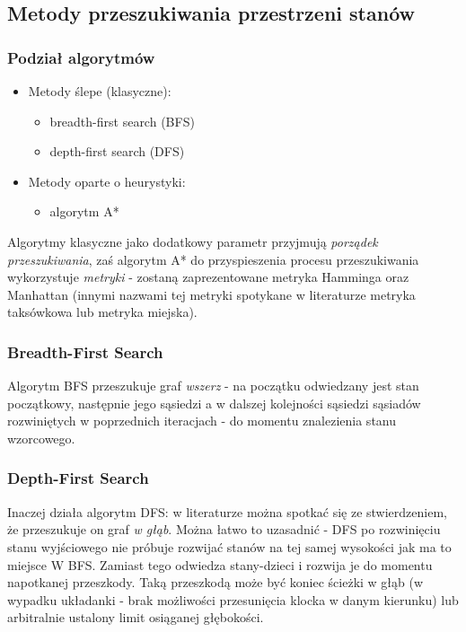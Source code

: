 \documentclass{classrep}
\begin{document}
\subsection{Metody przeszukiwania przestrzeni stanów}
\subsubsection{Podział algorytmów}
\begin{itemize}
  \item Metody ślepe (klasyczne):
    \begin{itemize}
      \item breadth-first search (BFS)
      \item depth-first search (DFS)
    \end{itemize}
  \item Metody oparte o heurystyki:
    \begin{itemize}
      \item algorytm A*
    \end{itemize}
\end{itemize}

Algorytmy klasyczne jako dodatkowy parametr przyjmują \emph{porządek
przeszukiwania}, zaś algorytm A* do przyspieszenia procesu
przeszukiwania wykorzystuje \emph{metryki} - zostaną zaprezentowane
metryka Hamminga oraz Manhattan (innymi nazwami tej metryki spotykane
w literaturze metryka taksówkowa lub metryka miejska).

\subsubsection{Breadth-First Search}

Algorytm BFS przeszukuje graf \emph{wszerz} - na początku
odwiedzany jest stan początkowy, następnie jego sąsiedzi
a w dalszej kolejności sąsiedzi sąsiadów rozwiniętych w poprzednich
iteracjach - do momentu znalezienia stanu wzorcowego.

\subsubsection{Depth-First Search}
Inaczej działa algorytm DFS: w literaturze można spotkać się ze
stwierdzeniem, że przeszukuje on graf \emph{w głąb}. Można łatwo to
uzasadnić - DFS po rozwinięciu stanu wyjściowego nie próbuje rozwijać stanów
na tej samej wysokości jak ma to miejsce W BFS. Zamiast tego odwiedza
stany-dzieci i rozwija je do momentu napotkanej przeszkody. Taką przeszkodą może
być koniec ścieżki w głąb (w wypadku układanki - brak możliwości przesunięcia
klocka w danym kierunku) lub arbitralnie ustalony limit osiąganej głębokości.
\end{document}
